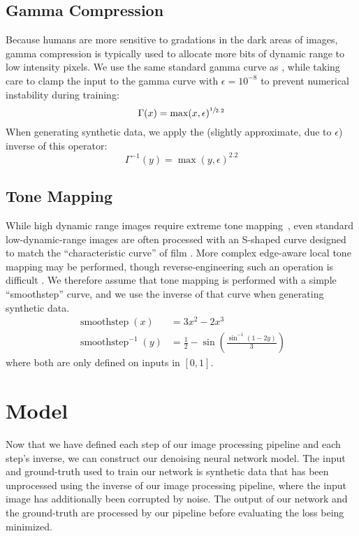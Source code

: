 \documentclass[10pt,twocolumn,letterpaper]{article}
\begin{document}
\subsection{Gamma Compression}
\label{sec:gamma}

Because humans are more sensitive to gradations in the dark areas of images, gamma compression is typically used to allocate more bits of dynamic range to low intensity pixels. We use the same standard gamma curve as \cite{plotz2017cvpr}, while taking care to clamp the input to the gamma curve with $\epsilon=10^{-8}$ to prevent numerical instability during training:
\begin{equation}
\Gamma(x) = \max(x, \epsilon)^{\sfrac{1}{2.2}}
\end{equation}
When generating synthetic data, we apply the (slightly approximate, due to $\epsilon$) inverse of this operator:
\begin{equation}
\Gamma^{-1}(y) = \max(y, \epsilon)^{2.2}
\end{equation}

\subsection{Tone Mapping}
\label{sec:tonemap}
While high dynamic range images require extreme tone mapping~\cite{Debevec1997}, even standard low-dynamic-range images are often processed with an S-shaped curve designed to match the ``characteristic curve'' of film \cite{davis1922sensitometry}.
More complex edge-aware local tone mapping may be performed, though reverse-engineering such an operation is difficult \cite{Paris2011}.
We therefore assume that tone mapping is performed with a simple ``smoothstep'' curve, and we use the inverse of that curve when generating synthetic data.
\begin{align}
\displaystyle \operatorname {smoothstep}(x)&= 3x^{2}-2x^{3}\\
\displaystyle \operatorname {smoothstep}^{-1}(y)&= \frac{1}{2} - {\sin}\left(\frac{{\sin}^{-1}(1-2y) }{ 3}\right)
\end{align}
where both are only defined on inputs in $[0, 1]$.

\section{Model}
\label{sec:model}

Now that we have defined each step of our image processing pipeline and each step's inverse, we can construct our denoising neural network model. The input and ground-truth used to train our network is synthetic data that has been unprocessed using the inverse of our image processing pipeline, where the input image has additionally been corrupted by noise.
The output of our network and the ground-truth are processed by our pipeline before evaluating the loss being minimized.
\end{document}
